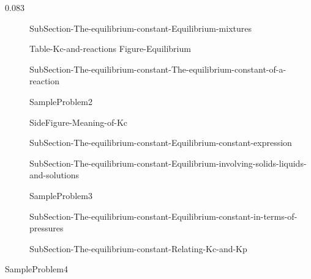 0.083\documentclass[main.tex]{subfiles}
\newcommand\chapterlabel{Ch-equilibrium}\setcounter{figurenewcounter}{0}\setcounter{tablenewcounter}{0}\setcounter{formulanewcounter}{0}
\begin{document}
\sloppy\begin{description}



\item[] {SubSection-The-equilibrium-constant-Equilibrium-mixtures}



 {Table-Kc-and-reactions}\newpage
{Figure-Equilibrium}

\item[] {SubSection-The-equilibrium-constant-The-equilibrium-constant-of-a-reaction}



  {SampleProblem2}

{SideFigure-Meaning-of-Kc}






\item[] {SubSection-The-equilibrium-constant-Equilibrium-constant-expression}

 
\item[] {SubSection-The-equilibrium-constant-Equilibrium-involving-solids-liquids-and-solutions}


  {SampleProblem3}


\item[] {SubSection-The-equilibrium-constant-Equilibrium-constant-in-terms-of-pressures}



\item[] {SubSection-The-equilibrium-constant-Relating-Kc-and-Kp}



\end{description}
  {SampleProblem4}
\end{document}
